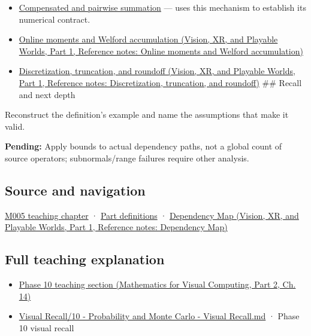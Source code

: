 \hypertarget{appendix-f82e270791c8-used-by}{}

\begin{itemize}
\item
  \hyperref[appendix-df318da57389]{Compensated and pairwise summation} --- uses this mechanism to establish its numerical contract.
\item
  \href{../07-Vision-XR-and-Playable-Worlds-P01/main.pdf\#appendix-33237f0f618b}{Online moments and Welford accumulation (Vision, XR, and Playable Worlds, Part 1, Reference notes: Online moments and Welford accumulation)}
\item
  \href{../07-Vision-XR-and-Playable-Worlds-P01/main.pdf\#appendix-6b0648b2b8e8}{Discretization, truncation, and roundoff (Vision, XR, and Playable Worlds, Part 1, Reference notes: Discretization, truncation, and roundoff)} \#\# Recall and next depth
\end{itemize}

Reconstruct the definition's example and name the assumptions that make it valid.

\textbf{Pending:} Apply bounds to actual dependency paths, not a global count of source operators; subnormals/range failures require other analysis.

\subsection{Source and navigation}\label{appendix-f82e270791c8-source-and-navigation}

\hypertarget{appendix-f82e270791c8-source-and-navigation}{}

\hyperref[01-foundations-i-ch001-when-arithmetic-meets-uncertainty]{M005 teaching chapter} · \hyperref[appendix-fd090d982a15-m005---parts-77-88]{Part definitions} · \href{../07-Vision-XR-and-Playable-Worlds-P01/main.pdf\#appendix-4ad47bdd269a}{Dependency Map (Vision, XR, and Playable Worlds, Part 1, Reference notes: Dependency Map)}

\subsection{Full teaching explanation}\label{appendix-f82e270791c8-full-teaching-explanation}

\hypertarget{appendix-f82e270791c8-full-teaching-explanation}{}

\begin{itemize}
\tightlist
\item
  \href{../02-Mathematics-for-Visual-Computing-P02/main.pdf\#02-foundations-ii-ch030-finite-samples-need-stable-descriptive-statistics}{Phase 10 teaching section (Mathematics for Visual Computing, Part 2, Ch. 14)}
\item
  \hyperref[appendix-cb5af353ef77]{Visual Recall/10 - Probability and Monte Carlo - Visual Recall.md} · Phase 10 visual recall
\end{itemize}
